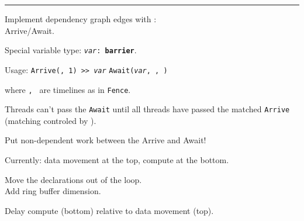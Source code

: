 {
\Large
\begin{tikzpicture}[node distance=0mm]




\end{tikzpicture}
}

\hrule

{\LARGE
Implement dependency graph edges with :\\Arrive/Await.
}

\newpage
{}

{\LARGE
Special variable type: \texttt{\textit{var}: \textbf{barrier}}.

Usage: \texttt{Arrive(, 1) >> \textit{var}} \hfill \texttt{Await(\textit{var}, , )}

where \texttt{, } are timelines as in \texttt{Fence}.

\hspace{5mm}

Threads can't pass the \texttt{Await} until all threads have passed the matched \texttt{Arrive} (matching controled by ).

\hspace{5mm}

Put non-dependent work between the Arrive and Await!

}

\newpage
{}

{\large

}

{\LARGE
Currently: data movement at the top, compute at the bottom.
}

\newpage
{}

{\large

}

{\LARGE
Move the  declarations out of the  loop.\\
Add ring buffer dimension.
}

\newpage
{}

{\large

}

{\LARGE
Delay compute (bottom) relative to data movement (top).
}

\newpage
{}

{\large

}

